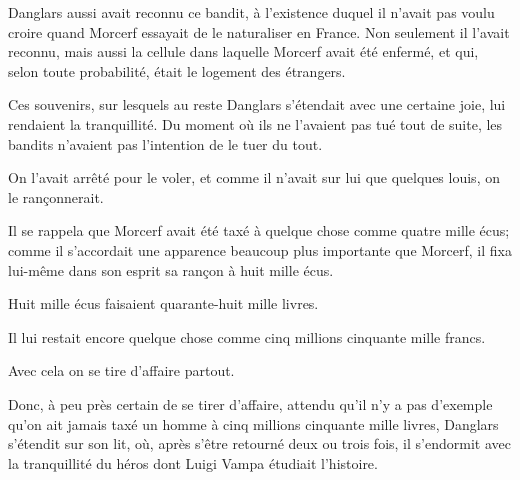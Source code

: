 Danglars aussi avait reconnu ce bandit, à l'existence duquel il n'avait pas voulu croire quand Morcerf essayait de le naturaliser en France. Non seulement il l'avait reconnu, mais aussi la cellule dans laquelle Morcerf avait été enfermé, et qui, selon toute probabilité, était le logement des étrangers. 

Ces souvenirs, sur lesquels au reste Danglars s'étendait avec une certaine joie, lui rendaient la tranquillité. Du moment où ils ne l'avaient pas tué tout de suite, les bandits n'avaient pas l'intention de le tuer du tout. 

On l'avait arrêté pour le voler, et comme il n'avait sur lui que quelques louis, on le rançonnerait. 

Il se rappela que Morcerf avait été taxé à quelque chose comme quatre mille écus; comme il s'accordait une apparence beaucoup plus importante que Morcerf, il fixa lui-même dans son esprit sa rançon à huit mille écus. 

Huit mille écus faisaient quarante-huit mille livres. 

Il lui restait encore quelque chose comme cinq millions cinquante mille francs. 

Avec cela on se tire d'affaire partout. 

Donc, à peu près certain de se tirer d'affaire, attendu qu'il n'y a pas d'exemple qu'on ait jamais taxé un homme à cinq millions cinquante mille livres, Danglars s'étendit sur son lit, où, après s'être retourné deux ou trois fois, il s'endormit avec la tranquillité du héros dont Luigi Vampa étudiait l'histoire. 